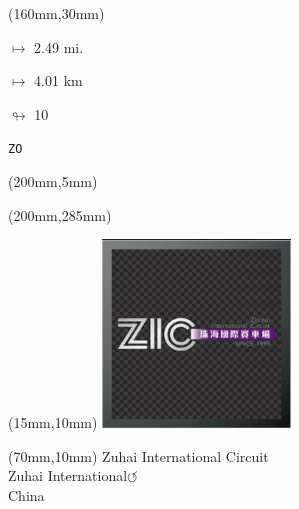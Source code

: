 \begin{textblock*}{40mm}(160mm,30mm)%
\Large
\par$\mapsto$ 2.49 mi.
\par$\mapsto$ 4.01 km
\par$\looparrowright$ 10
\par\hfill\tiny\tt ZO\\
\end{textblock*}
\begin{textblock*}{20mm}(200mm,5mm)%
\fbox{\thepage}
\label{ZO}
\end{textblock*}
\begin{textblock*}{20mm}(200mm,285mm)%
\fbox{\thepage}
\end{textblock*}

\null\newpage
\begin{textblock*}{50mm}(15mm,10mm)%
\includegraphics[width=50mm]{LG/2015-05-20_00099.png}
\end{textblock*}
\begin{textblock*}{130mm}(70mm,10mm)%
{\fontsize{20}{20}\selectfont Zuhai International Circuit\\}
{\fontsize{16}{16}\selectfont Zuhai International\hfill \huge$\circlearrowleft$\\}
{\fontsize{12}{12}\selectfont China\\}
\end{textblock*}
